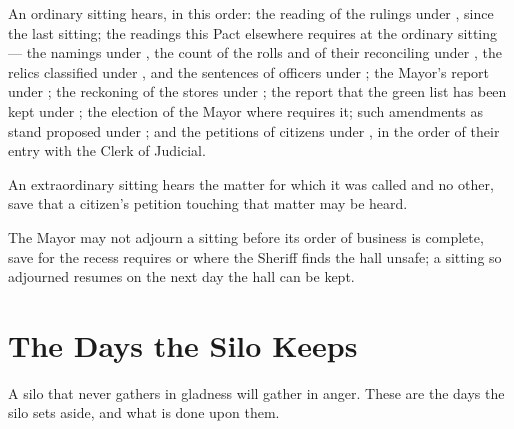 \begin{clauses}
\item An ordinary sitting hears, in this order: the reading of the rulings under , since the last sitting; the readings this Pact elsewhere requires at the ordinary sitting --- the namings under , the count of the rolls and of their reconciling under , the relics classified under , and the sentences of officers under ; the Mayor's report under ; the reckoning of the stores under ; the report that the green list has been kept under ; the election of the Mayor where  requires it; such amendments as stand proposed under ; and the petitions of citizens under , in the order of their entry with the Clerk of Judicial.
\item An extraordinary sitting hears the matter for which it was called and no other, save that a citizen's petition touching that matter may be heard.
\item The Mayor may not adjourn a sitting before its order of business is complete, save for the recess  requires or where the Sheriff finds the hall unsafe; a sitting so adjourned resumes on the next day the hall can be kept.
\end{clauses}

\section{The Days the Silo Keeps}
\label{sec:assembly:days-the-silo-keeps}

A silo that never gathers in gladness will gather in anger. These are the days the silo sets aside, and what is done upon them.

